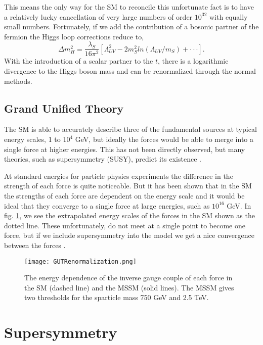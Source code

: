 This means the only way for the SM to reconcile this unfortunate fact is to have a relatively lucky cancellation of very large numbers of order $10^{32}$ with equally small numbers. Fortunately, if we add the contribution of a bosonic partner of the fermion the Higgs loop corrections reduce to,
\begin{equation}
\Delta m_{H}^{2}=\frac{\lambda_{S}}{16\pi^{2}}[\Lambda_{UV}^{2} - 2m_{S}^{2}ln(\Lambda_{UV}/m_{S})+\cdot\cdot\cdot].
\label{HiggsRenormalization}
\end{equation}
With the introduction of a scalar partner to the $t$, there is a logarithmic divergence to the Higgs boson mass and can be renormalized through the normal methods.

\subsection{Grand Unified Theory}

The SM is able to accurately describe three of the fundamental sources at typical energy scales, 1 to $10^{4}$ GeV, but ideally the forces would be able to merge into a single force at higher energies. This has not been directly observed, but many theories, such as supersymmetry (SUSY), predict its existence \cite{martin_supersymmetry_1997}.

At standard energies for particle physics experiments the difference in the strength of each force is quite noticeable. But it has been shown that in the SM the strengths of each force are dependent on the energy scale and it would be ideal that they converge to a single force at large energies, such as $10^{16}$ GeV. In fig. \ref{GUT}, we see the extrapolated energy scales of the forces in the SM shown as the dotted line. These unfortunately, do not meet at a single point to become one force, but if we include supersymmetry into the model we get a nice convergence between the forces \cite{martin_supersymmetry_1997}.

\begin{figure}
 	\centering
	\texttt{[image: GUTRenormalization.png]}
 	\caption[GUT Force Energy Dependence]{The energy dependence of the inverse gauge couple of each force in the SM (dashed line) and the MSSM (solid lines). The MSSM gives two thresholds for the sparticle mass 750 GeV and 2.5 TeV.}
 	\label{GUT} 
\end{figure}

\section{Supersymmetry}\label{sec:SUSY}

